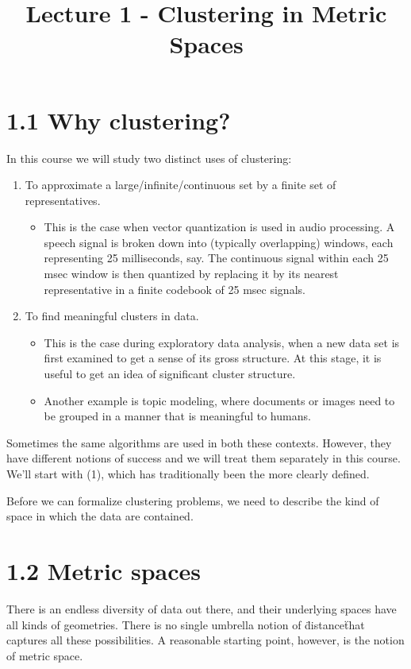 \documentclass{article}
\title{Lecture 1 - Clustering in Metric Spaces}
\author{}
\date{}
\begin{document}
\maketitle

\section*{1.1 Why clustering?}
In this course we will study two distinct uses of clustering:

\begin{enumerate}
    \item To approximate a large/infinite/continuous set by a finite set of representatives.
    \begin{itemize}
        \item This is the case when vector quantization is used in audio processing. A speech signal is broken down into (typically overlapping) windows, each representing 25 milliseconds, say. The continuous signal within each 25 msec window is then quantized by replacing it by its nearest representative in a finite codebook of 25 msec signals.
    \end{itemize}
    \item To find meaningful clusters in data.
    \begin{itemize}
        \item This is the case during exploratory data analysis, when a new data set is first examined to get a sense of its gross structure. At this stage, it is useful to get an idea of significant cluster structure.
        \item Another example is topic modeling, where documents or images need to be grouped in a manner that is meaningful to humans.
    \end{itemize}
\end{enumerate}

Sometimes the same algorithms are used in both these contexts. However, they have different notions of success and we will treat them separately in this course. We'll start with (1), which has traditionally been the more clearly defined.

Before we can formalize clustering problems, we need to describe the kind of space in which the data are contained.

\section*{1.2 Metric spaces}
There is an endless diversity of data out there, and their underlying spaces have all kinds of geometries. There is no single umbrella notion of \"distance\" that captures all these possibilities. A reasonable starting point, however, is the notion of metric space.
\end{document}
